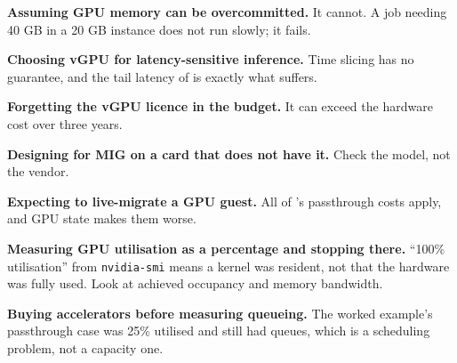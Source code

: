 \begin{pitfall}
\begin{tight}
  \item \textbf{Assuming GPU memory can be overcommitted.} It cannot. A job
        needing 40 GB in a 20 GB instance does not run slowly; it fails.
  \item \textbf{Choosing vGPU for latency-sensitive inference.} Time slicing
        has no guarantee, and the tail latency of  is
        exactly what suffers.
  \item \textbf{Forgetting the vGPU licence in the budget.} It can exceed the
        hardware cost over three years.
  \item \textbf{Designing for MIG on a card that does not have it.} Check the
        model, not the vendor.
  \item \textbf{Expecting to live-migrate a GPU guest.} All of
        's passthrough costs apply, and GPU state makes them
        worse.
  \item \textbf{Measuring GPU utilisation as a percentage and stopping there.}
        ``100\% utilisation'' from \texttt{nvidia-smi} means a kernel was
        resident, not that the hardware was fully used. Look at achieved
        occupancy and memory bandwidth.
  \item \textbf{Buying accelerators before measuring queueing.} The worked
        example's passthrough case was 25\% utilised and still had queues,
        which is a scheduling problem, not a capacity one.
\end{tight}
\end{pitfall}

